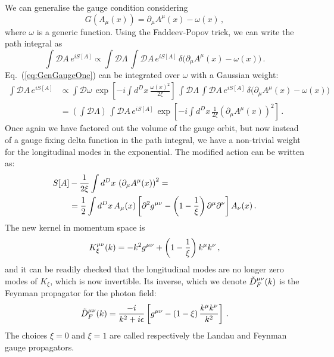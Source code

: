 We can generalise the gauge condition considering
\begin{equation}
  \label{eq:GenGauge}
  G\left(A_\mu(x)\right) = \partial_\mu A^\mu(x) - \omega(x)\, ,
\end{equation}
where $\omega$ is a generic function. Using the Faddeev-Popov trick,
we can write the path integral as
\begin{equation}
  \label{eq:GenGaugeOne}
  \int \mathcal{D}A\, e^{i S[A]} 
  \propto \int \mathcal{D}\Lambda\, 
    \int \mathcal{D}A\,  e^{i S[A]} \, \delta\Big(
        \partial_\mu A^\mu(x) - \omega(x)
      \Big) \, .
\end{equation}
Eq.~(\ref{eq:GenGaugeOne}) can be integrated over $\omega$ with a
Gaussian weight:
\begin{align}
   \int \mathcal{D}A\, e^{i S[A]} 
  &\propto \int \mathcal{D}\omega\, \exp \left[
    -i \int d^Dx\, \frac{\omega(x)^2}{2\xi}
    \right]\, 
    \int \mathcal{D}\Lambda\, 
    \int \mathcal{D}A\,  e^{i S[A]} \, \delta\Big(
        \partial_\mu A^\mu(x) - \omega(x)
      \Big) \nonumber \\
  &= \left(\int \mathcal{D}\Lambda\right)\, 
    \int \mathcal{D}A\,  e^{i S[A]} \, 
    \exp \left[
    -i \int d^Dx\, \frac{1}{2\xi}
    \left(\partial_\mu A^\mu(x)\right)^2
    \right]\, .
\end{align}
Once again we have factored out the volume of the gauge orbit, but now
instead of a gauge fixing delta function in the path integral, we have
a non-trivial weight for the longitudinal modes in the
exponential. The modified action can be written as:
 \begin{align}
   S[A] &- \frac{1}{2\xi} \int d^Dx\, \left(
          \partial_\mu A^\mu(x) 
          \right)^2 = \nonumber \\
   &= \frac12 \int d^Dx\, 
     A_\mu(x) \left[
     \partial^2 g^{\mu\nu} -
     \left(1-\frac{1}{\xi}\right) \partial^\mu\partial^\nu 
     \right] A_\nu(x)\, .
 \end{align}
The new kernel in momentum space is
\begin{align}
  K_\xi^{\mu\nu}(k) =-k^2 g^{\mu\nu} + \left(1-\frac{1}{\xi}\right) k^\mu
  k^\nu\, ,
\end{align}
and it can be readily checked that the longitudinal modes are no
longer zero modes of $K_\xi$, which is now invertible. Its inverse,
which we denote $\tilde{D}_F^{\mu\nu}(k)$ is the Feynman propagator for
the photon field: 
\begin{align}
  \tilde{D}_F^{\mu\nu}(k) = \frac{-i}{k^2+i\epsilon} 
  \left[
  g^{\mu\nu} - \left(1-\xi\right)\frac{k^\mu k^\nu}{k^2}
  \right]\, .
\end{align}
The choices $\xi=0$ and $\xi=1$ are called respectively the Landau and
Feynman gauge propagators.

